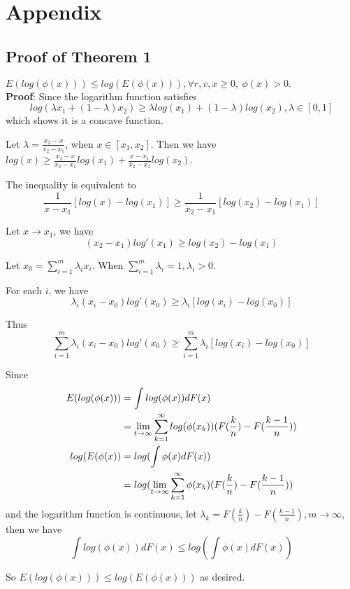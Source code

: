 \documentclass{gapd}
\begin{document}
\section*{Appendix}
\begin{appendix}
\section{Proof of Theorem 1}

\end{appendix}
\begin{lemma}
$E(log(\phi(x)))\le log(E(\phi(x))),\forall r,v,x \ge 0,\ \phi(x)> 0.$\\
\textbf{Proof}: Since the logarithm function satisfies
$$log(\lambda x_1 + (1-\lambda)x_2)\ge \lambda log(x_1)+(1-\lambda)log(x_2), \lambda \in [0,1]$$
which shows it is a concave function.

Let $\lambda=\frac{x_2-x}{x_2-x_1}$, when $x\in [x_1,x_2]$. Then we have $log(x) \ge \frac{x_2-x}{x_2-x_1}log(x_1)+\frac{x-x_1}{x_2-x_1}log(x_2)$.

The inequality is equivalent to
$$\frac{1}{x-x_1}[log(x)-log(x_1)] \ge \frac{1}{x_2-x_1}[log(x_2)-log(x_1)]$$

Let $x \to x_1$, we have
$$(x_2-x_1)log'(x_1) \ge log(x_2)-log(x_1)$$

Let $x_0=\sum^m_{i=1}{\lambda}_i x_i$. When $\sum^m_{i=1}{\lambda}_i=1, {\lambda}_i >0$.

For each $i$, we have
$${\lambda}_i(x_i-x_0)log'(x_0) \ge {\lambda}_i[log(x_i)-log(x_0)]$$

Thus
$$\sum_{i=1}^m{\lambda}_i(x_i-x_0)log'(x_0) \ge \sum_{i=1}^m{\lambda}_i[log(x_i)-log(x_0)]$$

Since
\begin{equation}
\begin{aligned}
E(log(\phi(x)))&=\int log(\phi(x))dF(x)\\
&=\lim\limits_{t \to \infty } \sum_{k=1}^{\infty}log(\phi(x_k))(F(\frac{k}{n})-F(\frac{k-1}{n}))\\
log(E(\phi(x))&=log(\int \phi(x)dF(x))\\
&=log(\lim\limits_{t \to \infty } \sum_{k=1}^{\infty}\phi(x_k)(F(\frac{k}{n})-F(\frac{k-1}{n}))
\end{aligned}\notag
\end{equation}
and the logarithm function is continuous, let ${\lambda}_k=F(\frac{k}{n})-F(\frac{k-1}{n}), m \to \infty$, then we have
$$\int log(\phi(x))dF(x) \le log(\int \phi(x)dF(x))$$

So $E(log(\phi(x)))\le log(E(\phi(x)))$ as desired.
\end{lemma}
\end{document}

